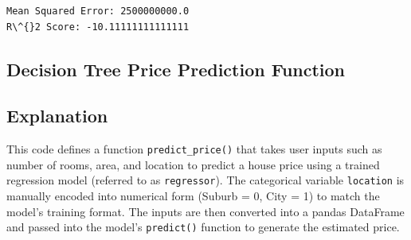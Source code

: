 \documentclass[11pt]{article}
\begin{document}
    \begin{Verbatim}[commandchars=\\\{\}]
Mean Squared Error: 2500000000.0
R\^{}2 Score: -10.11111111111111
    \end{Verbatim}


\subsection{Decision Tree Price Prediction Function}

\subsection*{Explanation}
This code defines a function \texttt{predict\_price()} that takes user inputs such as number of rooms, area, and location to predict a house price using a trained regression model (referred to as \texttt{regressor}). The categorical variable \texttt{location} is manually encoded into numerical form (Suburb = 0, City = 1) to match the model’s training format. The inputs are then converted into a pandas DataFrame and passed into the model’s \texttt{predict()} function to generate the estimated price.
\end{document}
